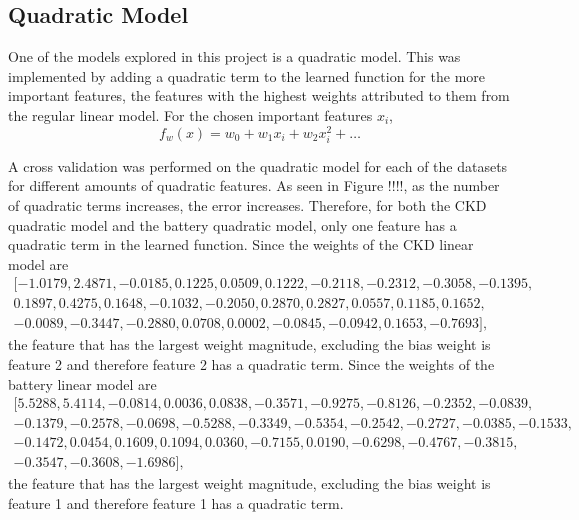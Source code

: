 \documentclass{article}
\begin{document}
\subsection{Quadratic Model}

One of the models explored in this project is a quadratic model.  This was implemented by adding a quadratic term to the learned function for the more important features, the features with the highest weights attributed to them from the regular linear model.  For the chosen important features $x_i$, 
\begin{equation}
   f_w(x) = w_0 + w_1 x_i + w_2 x_i^2 + \dots
\end{equation}

A cross validation was performed on the quadratic model for each of the datasets for different amounts of quadratic features.  As seen in Figure !!!!, 
as the number of quadratic terms increases, the error increases.  Therefore, for both the CKD quadratic model and the battery quadratic model, only one feature has a quadratic term in the learned function.   
Since the weights of the CKD linear model are 
\begin{equation*}
  \begin{aligned}
    [-1.0179,  2.4871, -0.0185,  0.1225, 0.0509,  0.1222, -0.2118, -0.2312, -0.3058, -0.1395, \\
    0.1897,  0.4275,  0.1648, -0.1032, -0.2050,  0.2870,  0.2827,  0.0557, 0.1185,  0.1652, \\
    -0.0089, -0.3447, -0.2880,  0.0708, 0.0002, -0.0845, -0.0942,  0.1653, -0.7693],
  \end{aligned}
\end{equation*}
the feature that has the largest weight magnitude, excluding  the bias weight is feature 2 and therefore feature 2 has a quadratic term.   
Since the weights of the battery linear model are 
\begin{equation*}
  \begin{aligned}
    [5.5288, 5.4114, -0.0814, 0.0036, 0.0838, -0.3571, -0.9275, -0.8126, -0.2352, -0.0839, \\
    -0.1379, -0.2578, -0.0698, -0.5288, -0.3349, -0.5354, -0.2542, -0.2727, -0.0385, -0.1533, \\
    -0.1472, 0.0454, 0.1609, 0.1094, 0.0360, -0.7155, 0.0190, -0.6298, -0.4767, -0.3815, \\
    -0.3547, -0.3608, -1.6986],
  \end{aligned}
  \end{equation*}
the feature that has the largest weight magnitude, excluding the bias weight is feature 1 and therefore feature 1 has a quadratic term. 
\end{document}
